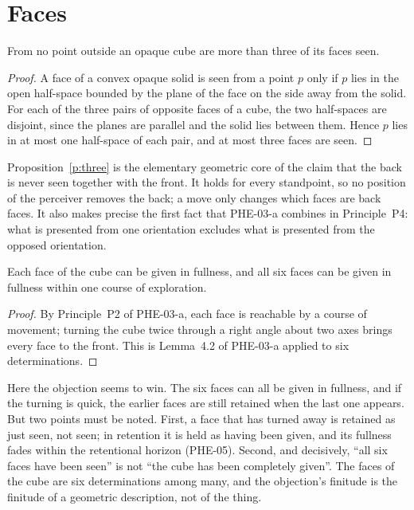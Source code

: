 \documentclass{situationist-preprint}
\begin{document}
\section{Faces}

\begin{proposition}\label{p:three}
From no point outside an opaque cube are more than three of its faces seen.
\end{proposition}

\begin{proof}
A face of a convex opaque solid is seen from a point $p$ only if $p$ lies in the open half-space bounded by the plane of the face on the side away from the solid. For each of the three pairs of opposite faces of a cube, the two half-spaces are disjoint, since the planes are parallel and the solid lies between them. Hence $p$ lies in at most one half-space of each pair, and at most three faces are seen.
\end{proof}

Proposition~\ref{p:three} is the elementary geometric core of the claim that the back is never seen together with the front. It holds for every standpoint, so no position of the perceiver removes the back; a move only changes which faces are back faces. It also makes precise the first fact that PHE-03-a combines in Principle~P4: what is presented from one orientation excludes what is presented from the opposed orientation.

\begin{proposition}\label{p:six}
Each face of the cube can be given in fullness, and all six faces can be given in fullness within one course of exploration.
\end{proposition}

\begin{proof}
By Principle~P2 of PHE-03-a, each face is reachable by a course of movement; turning the cube twice through a right angle about two axes brings every face to the front. This is Lemma~4.2 of PHE-03-a applied to six determinations.
\end{proof}

Here the objection seems to win. The six faces can all be given in fullness, and if the turning is quick, the earlier faces are still retained when the last one appears. But two points must be noted. First, a face that has turned away is retained as just seen, not seen; in retention it is held as having been given, and its fullness fades within the retentional horizon (PHE-05). Second, and decisively, \enquote{all six faces have been seen} is not \enquote{the cube has been completely given}. The faces of the cube are six determinations among many, and the objection's finitude is the finitude of a geometric description, not of the thing.
\end{document}
